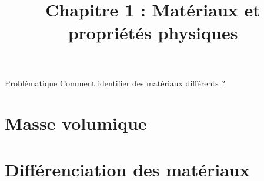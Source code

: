 \documentclass[xcolor={dvipsnames}]{beamer}
\title[Mat\'eriaux et propriétés physiques]{Chapitre 1 : Mat\'eriaux et propriétés physiques}
\begin{document}
\begin{frame}
  \titlepage 
\end{frame}


\begin{frame}
\begin{block}{Problématique}
	{\Large Comment identifier des matériaux différents ?}
\end{block}
\end{frame}


\section{Masse volumique}




\begin{frame}
	
\end{frame}



\section{Différenciation des matériaux}

\begin{frame}
	
\end{frame}



%
%	
%
%
%	
\end{document}
